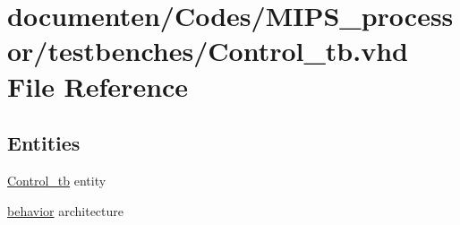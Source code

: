 \hypertarget{_control__tb_8vhd}{\section{documenten/\-Codes/\-M\-I\-P\-S\-\_\-processor/testbenches/\-Control\-\_\-tb.vhd File Reference}
\label{_control__tb_8vhd}
}
\subsection*{Entities}
\begin{DoxyCompactItemize}
\item 
\hyperlink{class_control__tb}{Control\-\_\-tb} entity
\item 
\hyperlink{class_control__tb_1_1behavior}{behavior} architecture
\end{DoxyCompactItemize}

